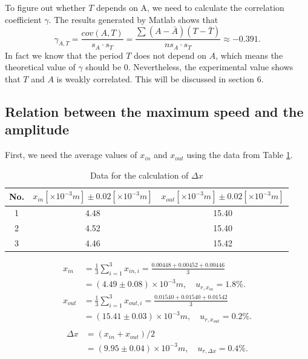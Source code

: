     To figure out whether $T$ depends on A, we need to calculate the correlation coefficient $\gamma$. The results generated by Matlab shows that
    \[
        \gamma_{A,T}=\frac{cov(A,T)}{s_A\cdot s_T}=\frac{\sum(A-\bar{A})(T-\bar{T})}{ns_A\cdot s_T}\approx -0.391.
    \]
    In fact we know that the period $T$ does not depend on $A$, which means the theoretical value of $\gamma$ should be $0$. Nevertheless, the experimental value shows that $T$ and $A$ is weakly correlated. This will be discussed in section 6.

\subsection{Relation between the maximum speed and the amplitude}
    First, we need the average values of $x_{in}$ and $x_{out}$ using the data from Table \ref{x}.
    \begin{table}[h] \small
        \centering
        \begin{tabular}{|c|c|c|}
            \hline
            No. & $x_{in}[\times10^{-3}m]\pm 0.02[\times10^{-3}m]$ & $x_{out}[\times10^{-3}m]\pm 0.02[\times10^{-3}m]$\\ \hline
            1 & 4.48 & 15.40\\ \hline
            2 & 4.52 & 15.40\\ \hline
            3 & 4.46 & 15.42\\ \hline
        \end{tabular}
        \caption{Data for the calculation of $\Delta x$}\label{x}
    \end{table}
    \[
    \begin{split}
        x_{in}&=\frac{1}{3}\sum_{i=1}^{3}x_{in,i}=\frac{0.00448+0.00452+0.00446}{3}\\
        &=(4.49\pm0.08)\times10^{-3}m,\quad u_{r,x_{in}}=1.8\%.\\[0.4cm]
        x_{out}&=\frac{1}{3}\sum_{i=1}^{3}x_{out,i}=\frac{0.01540+0.01540+0.01542}{3}\\
        &=(15.41\pm0.03)\times10^{-3}m,\quad u_{r,x_{out}}=0.2\%.\\
    \end{split}
    \]
    \[
    \begin{split}
        \Delta x&=(x_{in}+x_{out})/2\\
        &=(9.95\pm0.04)\times10^{-3}m,\quad u_{r,\Delta x}=0.4\%.
    \end{split}
    \]

